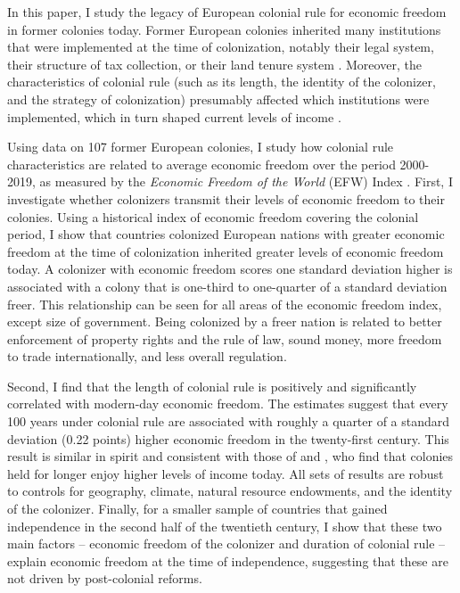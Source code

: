 \documentclass[a4paper,12pt]{article}
\begin{document}
In this paper, I study the legacy of European colonial rule for economic freedom in former colonies today. Former European colonies inherited many institutions that were implemented at the time of colonization, notably their legal system, their structure of tax collection, or their land tenure system \citep[e.g.][]{banerjee2005history,Levine2021,laporta1998law,garfias2021fiscal}. Moreover, the characteristics of colonial rule (such as its length, the identity of the colonizer, and the strategy of colonization) presumably affected which institutions were implemented, which in turn shaped current levels of income \citep[e.g.][]{grier1999colonial,Acemoglu2001}. 

Using data on 107 former European colonies, I study how colonial rule characteristics are related to average economic freedom over the period 2000-2019, as measured by the \textit{Economic Freedom of the World} (EFW) Index \citep{EFW_2021}. First, I investigate whether colonizers transmit their levels of economic freedom to their colonies. Using a historical index of economic freedom \citep{prados2016economic} covering the colonial period, I show that countries colonized European nations with greater economic freedom at the time of colonization inherited greater levels of economic freedom today. A colonizer with economic freedom scores one standard deviation higher is associated with a colony that is one-third to one-quarter of a standard deviation freer. This relationship can be seen for all areas of the economic freedom index, except size of government. Being colonized by a freer nation is related to better enforcement of property rights and the rule of law, sound money, more freedom to trade internationally, and less overall regulation.

Second, I find that the length of colonial rule is positively and significantly correlated with modern-day economic freedom. The estimates suggest that every 100 years under colonial rule are associated with roughly a quarter of a standard deviation (0.22 points) higher economic freedom in the twenty-first century. This result is similar in spirit and consistent with those of \cite{grier1999colonial} and \cite{feyrer2009colonialism}, who find that colonies held for longer enjoy higher levels of income today. All sets of results are robust to controls for geography, climate, natural resource endowments, and the identity of the colonizer. Finally, for a smaller sample of countries that gained independence in the second half of the twentieth century, I show that these two main factors -- economic freedom of the colonizer and duration of colonial rule -- explain economic freedom at the time of independence, suggesting that these are not driven by post-colonial reforms.
\end{document}
